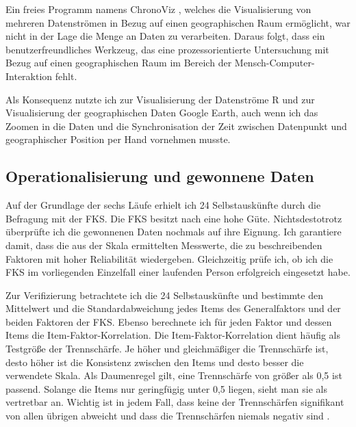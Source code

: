 Ein freies Programm namens ChronoViz \citep{Fouse2010, Fouse2011}, welches die Visualisierung von mehreren Datenströmen in Bezug auf einen geographischen Raum ermöglicht, war nicht in der Lage die Menge an Daten zu verarbeiten. Daraus folgt, dass ein benutzerfreundliches Werkzeug, das eine prozessorientierte Untersuchung mit Bezug auf einen geographischen Raum im Bereich der Mensch-Computer-Interaktion fehlt.

Als Konsequenz nutzte ich zur Visualisierung der Datenströme R und zur Visualisierung der geographischen Daten Google Earth, auch wenn ich das Zoomen in die Daten und die Synchronisation der Zeit zwischen Datenpunkt und geographischer Position per Hand vornehmen musste.

\subsection{Operationalisierung und gewonnene Daten} 

\label{sub:operationalisierung_und_gewonnene_daten_5_1}

Auf der Grundlage der sechs Läufe erhielt ich 24 Selbstauskünfte durch die Befragung mit der \ac{FKS}. Die \ac{FKS} besitzt nach \citet{Rheinberg2003} eine hohe Güte. Nichtsdestotrotz überprüfte ich die gewonnenen Daten nochmals auf ihre Eignung. Ich garantiere damit, dass die aus der Skala ermittelten Messwerte, die zu beschreibenden Faktoren mit hoher Reliabilität wiedergeben. Gleichzeitig prüfe ich, ob ich die \ac{FKS} im vorliegenden Einzelfall einer laufenden Person erfolgreich eingesetzt habe.

Zur Verifizierung betrachtete ich die 24 Selbstauskünfte und bestimmte den Mittelwert und die Standardabweichung jedes Items des Generalfaktors und der beiden Faktoren der \ac{FKS}. Ebenso berechnete ich für jeden Faktor und dessen Items die Item-Faktor-Korrelation. Die Item-Faktor-Korrelation dient häufig als Testgröße der Trennschärfe. Je höher und gleichmäßiger die Trennschärfe ist, desto höher ist die Konsistenz zwischen den Items und desto besser die verwendete Skala. Als Daumenregel gilt, eine Trennschärfe von größer als 0,5 ist passend. Solange die Items nur geringfügig unter 0,5 liegen, sieht man sie als vertretbar an. Wichtig ist in jedem Fall, dass keine der Trennschärfen signifikant von allen übrigen abweicht und dass die Trennschärfen niemals negativ sind \citep[][S.~219f.]{Bortz2006}.

